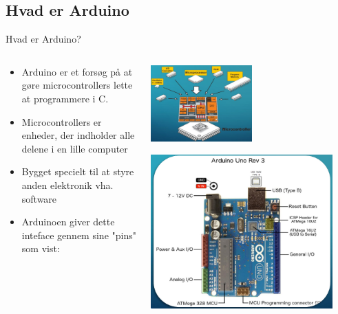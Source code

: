 \documentclass{beamer}
\begin{document}
\subsection{Hvad er Arduino}
\begin{frame}[fragile]{Hvad er Arduino?}
\begin{columns}
\begin{column}{0.5\textwidth}
\begin{itemize}
	\item{{\color{arduinoBlue}Arduino} er et forsøg på at gøre microcontrollers lette at programmere i C.}
	\item{Microcontrollers er enheder, der indholder alle delene i en lille computer}
	\item{Bygget specielt til at styre anden elektronik vha. software}
	\item{Arduinoen giver dette inteface gennem sine "pins" som vist:}
\end{itemize}
\end{column}
\begin{column}{0.5\textwidth}
	\begin{center}
		\includegraphics[width=0.5\textwidth]{assets/microcontroller.png}
	\end{center}
	\begin{center}
		\includegraphics[width=0.9\textwidth]{assets/arduino_layout.png}
	\end{center}
\end{column}
\end{columns}
\end{frame}
\end{document}
